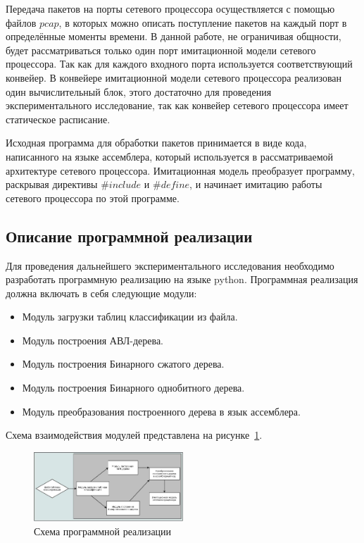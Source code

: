 \documentclass[9pt,a4paper]{article}
\begin{document}
        Передача пакетов на порты сетевого процессора осуществляется с помощью файлов $pcap$, в которых можно описать поступление пакетов на каждый порт в определённые моменты времени.
        В данной работе, не ограничивая общности, будет рассматриваться только один порт имитационной модели сетевого процессора. Так как для каждого входного
        порта используется соответствующий конвейер. В конвейере имитационной модели сетевого процессора реализован один вычислительный блок, этого достаточно для проведения 
        экспериментального исследование, так как конвейер сетевого процессора имеет статическое расписание.

        Исходная программа для обработки пакетов принимается в виде кода, написанного на языке ассемблера, который используется в рассматриваемой архитектуре сетевого процессора.
        Имитационная модель преобразует программу, раскрывая директивы $\#include$ и $\#define$, и начинает имитацию работы сетевого процессора по этой программе.
        
        
    \subsection{Описание программной реализации}
        Для проведения дальнейшего экспериментального исследования необходимо разработать программную реализацию на языке python. Программная реализация должна включать в себя
        следующие модули:
        
        \begin{itemize}
            \item Модуль загрузки таблиц классификации из файла.
            \item Модуль построения АВЛ-дерева.
            \item Модуль построения Бинарного сжатого дерева.
            \item Модуль построения Бинарного однобитного дерева.
            \item Модуль преобразования построенного дерева в язык ассемблера.
        \end{itemize}
        Схема взаимодействия модулей представлена на рисунке~\ref{fig:mesh5}.
       
        \begin{figure}[ht]
            \centering
            \includegraphics[width=0.5\textwidth]{program_scheme.jpg}
            \caption{Схема программной реализации}\label{fig:mesh5}
        \end{figure}        
\end{document}
